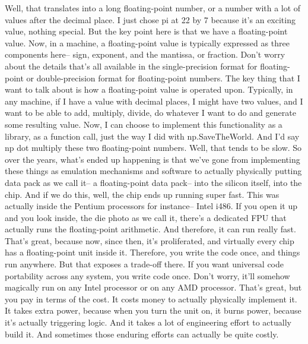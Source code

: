 Well, that translates into a long floating-point number, or a number with a lot of values after the decimal place.
I just chose pi at 22 by 7 because it's an exciting value, nothing special.
But the key point here is that we have a floating-point value.
Now, in a machine, a floating-point value is typically expressed as three components here-- sign, exponent, and the mantissa, or fraction.
Don't worry about the details that's all available in the single-precision format for floating-point or double-precision format for floating-point numbers.
The key thing that I want to talk about is how a floating-point value is operated upon.
Typically, in any machine, if I have a value with decimal places, I might have two values, and I want to be able to add, multiply, divide, do whatever I want to do and generate some resulting value.
Now, I can choose to implement this functionality as a library, as a function call, just the way I did with np.SaveTheWorld.
And I'd say np dot multiply these two floating-point numbers.
Well, that tends to be slow.
So over the years, what's ended up happening is that we've gone from implementing these things as emulation mechanisms and software to actually physically putting data pack as we call it-- a floating-point data pack-- into the silicon itself, into the chip.
And if we do this, well, the chip ends up running super fast.
This was actually inside the Pentium processors for instance-- Intel i486.
If you open it up and you look inside, the die photo as we call it, there's a dedicated FPU that actually runs the floating-point arithmetic.
And therefore, it can run really fast.
That's great, because now, since then, it's proliferated, and virtually every chip has a floating-point unit inside it.
Therefore, you write the code once, and things run anywhere.
But that exposes a trade-off there.
If you want universal code portability across any system, you write code once.
Don't worry, it'll somehow magically run on any Intel processor or on any AMD processor.
That's great, but you pay in terms of the cost.
It costs money to actually physically implement it.
It takes extra power, because when you turn the unit on, it burns power, because it's actually triggering logic.
And it takes a lot of engineering effort to actually build it.
And sometimes those enduring efforts can actually be quite costly.




